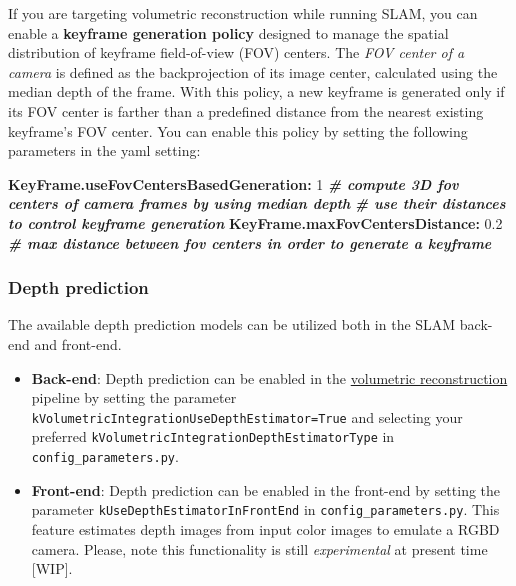 \documentclass{article}
\newenvironment{Shaded}{\begin{snugshade}}{\end{snugshade}}
\newcommand{\AttributeTok}[1]{\textcolor[rgb]{0.74,0.68,0.62}{#1}}
\newcommand{\CommentTok}[1]{\textcolor[rgb]{0.00,0.40,1.00}{\textbf{\textit{#1}}}}
\newcommand{\DecValTok}[1]{\textcolor[rgb]{0.27,0.67,0.26}{#1}}
\newcommand{\FloatTok}[1]{\textcolor[rgb]{0.27,0.67,0.26}{#1}}
\newcommand{\FunctionTok}[1]{\textcolor[rgb]{1.00,0.58,0.35}{\textbf{#1}}}
\begin{document}
If you are targeting volumetric reconstruction while running SLAM, you
can enable a \textbf{keyframe generation policy} designed to manage the
spatial distribution of keyframe field-of-view (FOV) centers. The
\emph{FOV center of a camera} is defined as the backprojection of its
image center, calculated using the median depth of the frame. With this
policy, a new keyframe is generated only if its FOV center is farther
than a predefined distance from the nearest existing keyframe's FOV
center. You can enable this policy by setting the following parameters
in the yaml setting:\\

\begin{scriptsize}
\begin{Shaded}
\begin{Highlighting}[]
\FunctionTok{KeyFrame.useFovCentersBasedGeneration:}\AttributeTok{ }\DecValTok{1}\AttributeTok{  }\CommentTok{# compute 3D fov centers of camera frames by using median depth }
\FunctionTok{}\AttributeTok{ }\DecValTok{}\AttributeTok{  }\CommentTok{                                       # use their distances to control keyframe generation}
\FunctionTok{KeyFrame.maxFovCentersDistance:}\AttributeTok{ }\FloatTok{0.2}\AttributeTok{       }\CommentTok{# max distance between fov centers in order to generate a keyframe}
\end{Highlighting}
\end{Shaded}
\end{scriptsize}


\hypertarget{depth-prediction}{%
\subsubsection{Depth prediction}\label{depth-prediction}}

The available depth prediction models can be utilized both in the SLAM
back-end and front-end. 
\begin{itemize}
\item \textbf{Back-end}: Depth prediction can be
enabled in the \protect\hyperlink{volumetric-reconstruction}{volumetric
reconstruction} pipeline by setting the parameter
\texttt{kVolumetricIntegrationUseDepthEstimator=True} and selecting your
preferred \texttt{kVolumetricIntegrationDepthEstimatorType} in
\texttt{config\_parameters.py}. 
\item \textbf{Front-end}: Depth prediction
can be enabled in the front-end by setting the parameter
\texttt{kUseDepthEstimatorInFrontEnd} in \texttt{config\_parameters.py}.
This feature estimates depth images from input color images to emulate a
RGBD camera. Please, note this functionality is still
\emph{experimental} at present time {[}WIP{]}.
\end{itemize}
\end{document}
